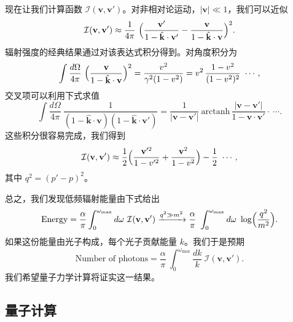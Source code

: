 现在让我们计算函数 $\mathcal{I}(\mathbf{v},\mathbf{v}')$。对非相对论运动，$|\mathbf{v}| \ll 1$，我们可以近似
\begin{equation}
  \mathcal{I}(\mathbf{v},\mathbf{v}') \approx
    \frac{1}{4\pi}\ \Bigl( \frac{\mathbf{v}'}{1 - \hat{\mathbf{k}}\cdot\mathbf{v}'}
      - \frac{\mathbf{v}}{1 - \hat{\mathbf{k}}\cdot\mathbf{v}} \Bigr)^2 .
  \label{eq:6.13}
\end{equation}
辐射强度的经典结果通过对该表达式积分得到。对角度积分为
\begin{equation}
  \int \frac{d\Omega}{4\pi}\ \Bigl( \frac{\mathbf{v}}{1-\hat{\mathbf{k}}\cdot\mathbf{v}}
    \Bigr)^2 = \frac{v^2}{\gamma^2(1-v^2)}
    = v^2\,\frac{1-v^2}{(1-v^2)^2}\ \cdots ,
\end{equation}
交叉项可以利用下式求值
\begin{equation}
  \int \frac{d\Omega}{4\pi}\ \frac{1}{(1-\hat{\mathbf{k}}\cdot\mathbf{v})
    (1-\hat{\mathbf{k}}\cdot\mathbf{v}')}
  = \frac{1}{|\mathbf{v}-\mathbf{v}'|}\ \mathrm{arctanh}\,
    \frac{|\mathbf{v}-\mathbf{v}'|}{1 - \mathbf{v}\cdot\mathbf{v}'}
    \cdot\ \cdots .
  \label{eq:6.16}
\end{equation}
这些积分很容易完成，我们得到
\begin{equation}
  \mathcal{I}(\mathbf{v},\mathbf{v}') \approx
    \frac{1}{2}\Bigl( \frac{\mathbf{v}'^2}{1-v'^2} + \frac{\mathbf{v}^2}{1-v^2}
      \Bigr) - \frac{1}{2}\ \cdots ,
  \label{eq:6.17}
\end{equation}
其中 $q^2 = (p'-p)^2$。

总之，我们发现低频辐射能量由下式给出
\begin{equation}
  \text{Energy} = \frac{\alpha}{\pi}\int_0^{\omega_{\mathrm{max}}}
    d\omega\ \mathcal{I}(\mathbf{v},\mathbf{v}')
  \xrightarrow{q^2 \gg m^2}
  \frac{\alpha}{\pi}\ \int_0^{\omega_{\mathrm{max}}} d\omega\
    \log\Bigl( \frac{q^2}{m^2} \Bigr).
  \label{eq:6.18}
\end{equation}
如果这份能量由光子构成，每个光子贡献能量 $k$。我们于是预期
\begin{equation}
  \text{Number of photons} = \frac{\alpha}{\pi}\ \int_0^{\omega_{\mathrm{max}}}
    \frac{dk}{k}\ \mathcal{I}(\mathbf{v},\mathbf{v}') .
  \label{eq:6.19}
\end{equation}
我们希望量子力学计算将证实这一结果。

\subsection{量子计算}

